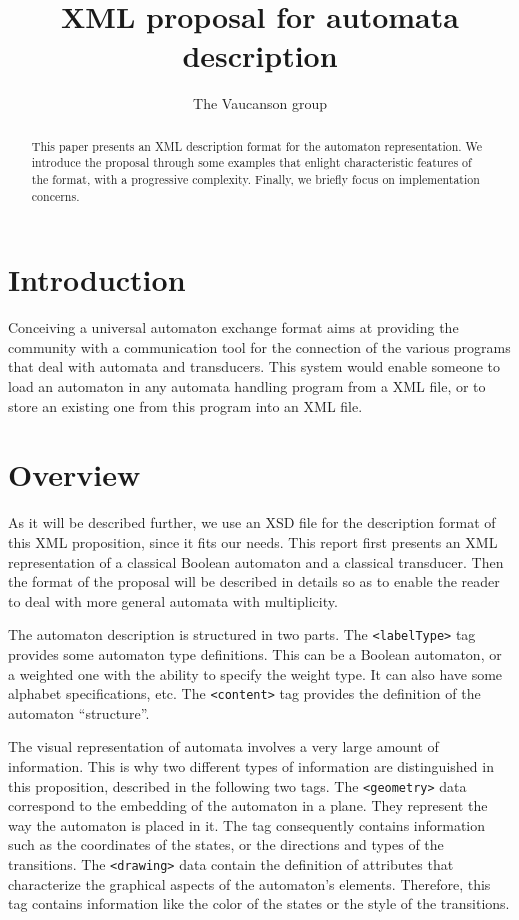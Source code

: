 \documentclass[a4paper]{article}
\newcommand{\Vauc}{{\sc Vaucanson}\xspace}
\newcommand{\xtag}[1]{\texttt{<#1>}}
\begin{document}
\title{XML proposal for automata description}

\author{The \Vauc group}

\maketitle{}

\begin{abstract}
This paper presents an XML description format for the automaton
representation. We introduce the proposal through some examples that
enlight characteristic features of the format, with a progressive
complexity. Finally, we briefly focus on implementation concerns.
\end{abstract}

\section*{Introduction}

Conceiving a universal automaton exchange format aims at providing the
community with a communication tool for the connection
of the various programs that deal with automata and transducers.  This
system would enable someone to load an automaton in any automata
handling program from a XML file, or to store an existing one from
this program into an XML file.

\section{Overview}

As it will be described further, we use an XSD file \cite{vaucanson.www.xsd}
for the description format of this XML proposition, since it fits our needs.
This report first presents an XML representation of a classical Boolean
automaton and a classical transducer. Then the format of the proposal will be
described in details so as to enable the reader to deal with more general
automata with multiplicity.

The automaton description is structured in two parts.  The
\xtag{labelType} tag provides some automaton type definitions. This can be a
Boolean automaton, or a weighted one with the ability to specify the
weight type.  It can also have some alphabet specifications, etc. The
\xtag{content} tag provides the definition of the automaton
``structure''.

The visual representation of automata involves a very large amount of
information. This is why two different types of information are
distinguished in this proposition, described in the following
two tags.  The \xtag{geometry} data correspond to the embedding
of the automaton in a plane. They represent the way the automaton is
placed in it. The tag consequently contains information such as the
coordinates of the states, or the directions and types of the
transitions. The \xtag{drawing} data contain the definition of
attributes that characterize the graphical aspects of the automaton's
elements. Therefore, this tag contains information like the color of
the states or the style of the transitions.
\end{document}
